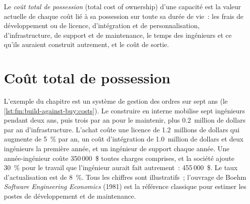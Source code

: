 \begin{definition}\label{def:fm:build-against-buy:tco}
Le \emph{coût total de possession} (total cost of ownership) d'une capacité est la valeur actuelle de chaque coût lié à sa possession sur toute sa durée de vie~:
les frais de développement ou de licence, d'intégration et de personnalisation, d'infrastructure, de support et de maintenance, le temps des ingénieurs et ce qu'ils auraient
construit autrement, et le coût de sortie.
\end{definition}

\section{Coût total de possession}

L'exemple du chapitre est un système de gestion des ordres sur sept ans (le \cref{lst:fm:build-against-buy:costs}). Le construire en interne mobilise sept ingénieurs
pendant deux ans, puis trois par an pour le maintenir, plus 0.2~million de dollars par an d'infrastructure. L'achat coûte une licence de 1.2~millions de dollars qui augmente de 5~\% par
an, un coût d'intégration de 1.0~million de dollars et deux ingénieurs la première année, et un ingénieur de support chaque année. Une année-ingénieur coûte 350\,000~\$
toutes charges comprises, et la société ajoute 30~\% pour le travail que l'ingénieur aurait fait autrement~: 455\,000~\$. Le taux d'actualisation est de 8~\%. Tous les chiffres sont
illustratifs~; l'ouvrage de Boehm \emph{Software Engineering Economics} (1981) est la référence classique pour estimer les postes de développement et de maintenance.

\label{lst:fm:build-against-buy:costs}

